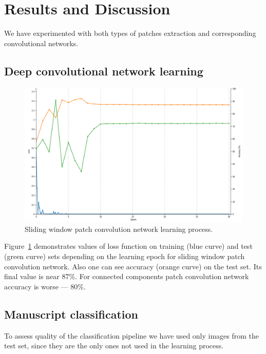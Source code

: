 \documentclass[conference,a4paper,twocolumn]{IEEEtran}
\begin{document}
\section{Results and Discussion}
\label{sec:results_and_description}

We have experimented with both types of patches extraction and corresponding convolutional networks. 

\subsection{Deep convolutional network learning}

\begin{figure}[!ht]
\centering
\includegraphics[scale=0.15]{figures/alexnet_loss.png}
\caption{Sliding window patch convolution network learning process.}
\label{img_alexnet}
\end{figure}

Figure~\ref{img_alexnet} demonstrates values of loss function on training (blue curve) and test (green curve) sets depending on the learning epoch for sliding window patch convolution network. Also one can see accuracy (orange curve) on the test set. Its final value is near $87 \%$. For connected components patch convolution network accuracy is worse --- $80 \%$.    

\subsection{Manuscript classification}

To assess quality of the classification pipeline we have used only images from the test set, since they are the only ones not used in the learning process. 
\end{document}
